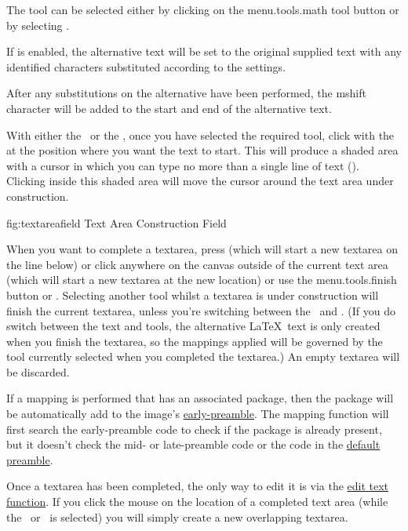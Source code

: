 
The  tool can be selected either by clicking on the
\gls{menu.tools.math} tool button or by selecting .

If  is enabled, the alternative text will be set
to the original supplied text with any identified characters
substituted according to the  settings.

After any substitutions on the alternative have been performed, 
the \gls{mshift} character will be added to the start and end
of the alternative text.


With either the \texttool\ or the \mathstool,
once you have selected the required tool, click with the
 at the position where
you want the text to start. This will produce a shaded area with a
cursor in which you can type no more than a single line of text
().
Clicking inside this shaded area will move the cursor around the
text area under construction.

\FloatFig
  {fig:textareafield}
  {}
  {Text Area Construction Field}

When you want to complete a \gls{textarea}, press
 (which will start a new
\gls{textarea} on the line below) or click anywhere on the canvas
outside of the current text area (which will start a new
\gls{textarea} at the new location) or use the
\gls{menu.tools.finish} button or .  Selecting
another tool whilst a \gls{textarea} is under construction will
finish the current \gls{textarea}, unless you're switching between
the \texttool\ and \mathstool.  (If you do switch between the
text and  tools, the alternative \LaTeX\ text is only
created when you finish the \gls*{textarea}, so the mappings applied
will be governed by the tool currently selected when you completed
the \gls*{textarea}.) An empty \gls{textarea} will be discarded.

If a mapping is performed that has an associated package, then the
package will be automatically add to the image's
\hyperref[sec:preamblepanels]{early-preamble}. The mapping function will
first search the early-preamble code to check if the package is
already present, but it doesn't check the mid- or late-preamble code
or the code in the \hyperref[sec:texconfigpreamble]{default
preamble}.

Once a \gls{textarea} has been completed, the only way to edit it is via the
\hyperref[sec:edittext]{edit text function}. If you click the
mouse on the location of a completed text area (while the
\texttool\ or \mathstool\ is selected) you will simply create a new
overlapping \gls*{textarea}.

